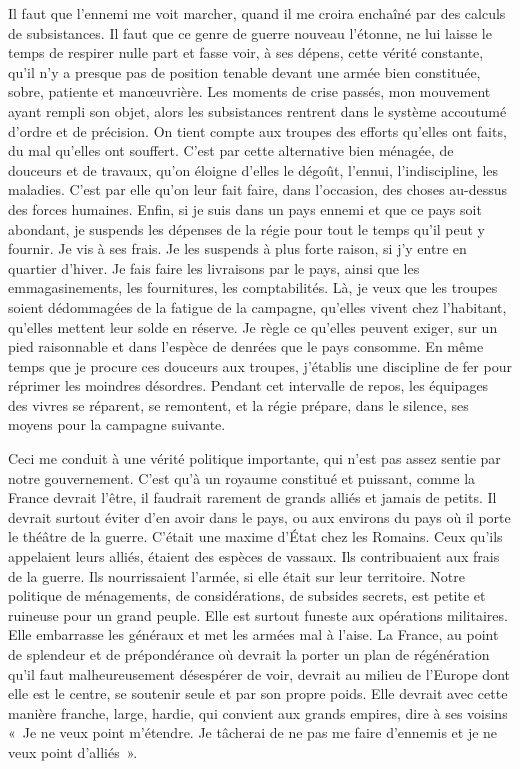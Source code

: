 \documentclass[french,twoside]{book} %
\begin{document}
Il faut que l’ennemi me voit marcher, quand il me croira enchaîné par des calculs de subsistances. Il faut que ce genre de guerre nouveau l’étonne, ne lui laisse le temps de respirer nulle part et fasse voir, à ses dépens, cette vérité constante, qu’il n’y a presque pas de position tenable devant une armée bien constituée, sobre, patiente et manœuvrière. Les moments de crise passés, mon mouvement ayant rempli son objet, alors les subsistances rentrent dans le système accoutumé d’ordre et de précision. On tient compte aux troupes des efforts qu’elles ont faits, du mal qu’elles ont souffert. C’est par cette alternative bien ménagée, de douceurs et de travaux, qu’on éloigne d’elles le dégoût, l’ennui, l’indiscipline, les maladies. C’est par elle qu’on leur fait faire, dans l’occasion, des choses au-dessus des forces humaines. Enfin, si je suis dans un pays ennemi et que ce pays soit abondant, je suspends les dépenses de la régie pour tout le temps qu’il peut y fournir. Je vis à ses frais. Je les suspends à plus forte raison, si j’y entre en quartier d’hiver. Je fais faire les livraisons par le pays, ainsi que les emmagasinements, les fournitures, les comptabilités. Là, je veux que les troupes soient dédommagées de la fatigue de la campagne, qu’elles vivent chez l’habitant, qu’elles mettent leur solde en réserve. Je règle ce qu’elles peuvent exiger, sur un pied raisonnable et dans l’espèce de denrées que le pays consomme. En même temps que je procure ces douceurs aux troupes, j’établis une discipline de fer pour réprimer les moindres désordres. Pendant cet intervalle de repos, les équipages des vivres se réparent, se remontent, et la régie prépare, dans le silence, ses moyens pour la campagne suivante.\par
Ceci me conduit à une vérité politique importante, qui n’est pas assez sentie par notre gouvernement. C’est qu’à un royaume constitué et puissant, comme la France devrait l’être, il faudrait rarement de grands alliés et jamais de petits. Il devrait surtout éviter d’en avoir dans le pays, ou aux environs du pays où il porte le théâtre de la guerre. C’était une maxime d’État chez les Romains. Ceux qu’ils appelaient leurs alliés, étaient des espèces de vassaux. Ils contribuaient aux frais de la guerre. Ils nourrissaient l’armée, si elle était sur leur territoire. Notre politique de ménagements, de considérations, de subsides secrets, est petite et ruineuse pour un grand peuple. Elle est surtout funeste aux opérations militaires. Elle embarrasse les généraux et met les armées mal à l’aise. La France, au point de splendeur et de prépondérance où devrait la porter un plan de régénération qu’il faut malheureusement désespérer de voir, devrait au milieu de l’Europe dont elle est le centre, se soutenir seule et par son propre poids. Elle devrait avec cette manière franche, large, hardie, qui convient aux grands empires, dire à ses voisins « Je ne veux point m’étendre. Je tâcherai de ne pas me faire d’ennemis et je ne veux point d’alliés ».\par
\end{document}
